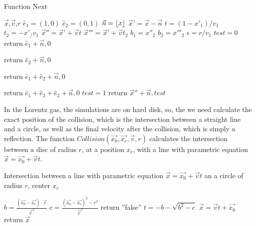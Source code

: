 \documentclass{iopart}
\begin{document}
\begin{algorithm}
\caption{Function Next}
\label{alg:next}
\begin{algorithmic}
 {$\vec{x}$,$\vec{v}$,$r$} 
\State    $\hat{e}_1=(1,0)$
\State    $\hat{e}_2=(0,1)$ 
\State    $\vec{n}=\floor*{x}$
\State    $\vec{x}'=\vec{x}-\vec{n}$
\State    $t=(1-x'_1)/v_1$
\State    $t_2=-x'_/v_1$
\State    $\vec{x}''=\vec{x}'+\vec{v} t$
\State    $\vec{x}'''=\vec{x}'+\vec{v} t_2$
\State    $b_1=x''_2$
\State    $b_2=x'''_2$
\State    $\epsilon=r/v_1$
\State    $test=0$
    \State  return  $\hat{e}_1+\vec{n},0$ 
    \EndIf
\EndIf
  
\State       return $\hat{e}_2+\vec{n}, 0$            
        \EndIf        
    \EndIf
    
\State        return $\hat{e}_1+\hat{e}_2+\vec{n}, 0$
        \EndIf
    \EndIf
    
\State        return $\hat{e}_1+\hat{e}_2+\hat{e}_2+\vec{n}, 0$
        \EndIf
    \EndIf
\State    $test=1$
\State    return $\vec{x}''+\vec{n}, test$

\EndFunction
\end{algorithmic}
\end{algorithm}



In the Lorentz gas, the simulations are on hard disk, so, the we need calculate the exact position of the collision, which is the intersection between a straight line and a circle, as well as the final velocity after the collision, which is simply a reflection. The function $Collision(\vec{x_0}, \vec{x_c}, \vec{v},r)$
calculates the intersection between a disc of radius $r$, at a position $x_c$, with a line with parametric equation $\vec{x}=\vec{x_0}+\vec{v}t $. 
\begin{algorithm}
\caption{Intersection between a line with parametric equation $\vec{x}=\vec{x_0}+\vec{v}t $ an a circle of radius $r$, center $x_c$}
\label{alg:collision}
\begin{algorithmic}
\State $b=\frac {(\vec{x_0}-\vec{x_c}) \cdot \vec{v}}{ \vec{v}^2}$
\State $c=\frac {(\vec{x_0}-\vec{x_c})^2 -r^2}{ \vec{v}^2}$
\State return ''false''
\EndIf
\State $t=-b-\sqrt{b^2-c}$
\State $\vec{x}=\vec{v} t+\vec{x_0}$
\State return $\vec{x}$
\EndFunction
\end{algorithmic}
\end{algorithm}
\end{document}

